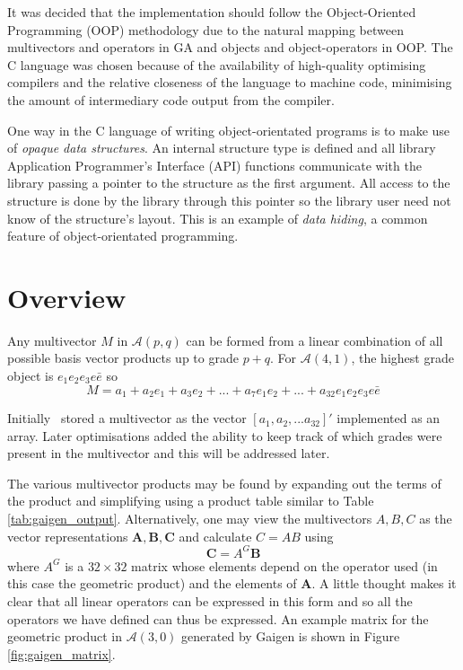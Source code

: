 It was decided that the implementation should follow the 
Object-Oriented Programming (OOP) methodology due to the natural mapping
between multivectors and operators in GA and objects and object-operators
in OOP. The C language was chosen because of the availability of high-quality 
optimising compilers and the relative closeness of the language to machine 
code, minimising the amount of intermediary code output from the compiler.

One way in the C language of writing object-orientated programs is to make
use of \emph{opaque data structures}. An internal structure type is defined
and all library Application Programmer's Interface (API) functions communicate
with the library passing a 
pointer to the structure as the first argument. All access to the
structure is done by the library through this pointer so the library
user need not know of the structure's layout. This is an example
of \emph{data hiding}, a common feature of object-orientated programming.

\section{Overview}


Any multivector $M$ in $\mathcal{A}(p,q)$ can be formed from a linear
combination of all possible basis vector products up to grade $p+q$. For
$\mathcal{A}(4,1)$, the highest grade object is $e_1e_2e_3e\bar{e}$ so \[ M =
a_1 + a_2 e_1 + a_3 e_2 + ... + a_7 e_1e_2 + ... + a_{32} e_1e_2e_3e\bar{e} \]

Initially \libcga\ stored a multivector as the vector $[ a_1, a_2, ...
a_{32} ]'$ implemented as an array. Later optimisations added the ability to
keep track of which grades were present in the multivector and this will be
addressed later.

The various multivector products may be found by expanding out the terms of the
product and simplifying using a product table similar to Table
\ref{tab:gaigen_output}.  Alternatively, one may view the multivectors $A, B,
C$ as the vector representations $\mathbf{A}, \mathbf{B}, \mathbf{C}$ and
calculate $C = AB$ using \[ \mathbf{C} = A^{G} \mathbf{B} \] where $A^G$ is a
$32 \times 32$ matrix whose elements depend on the operator used (in this case
the geometric product) and the elements of $\mathbf{A}$. A little thought makes
it clear that all linear operators can be expressed in this form and so all the
operators we have defined can thus be expressed. An example matrix for the
geometric product in $\mathcal{A}(3,0)$ generated by Gaigen is shown in Figure
\ref{fig:gaigen_matrix}.

